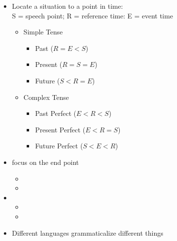 \documentclass[headrule,footrule]{foils}
\begin{document}
\begin{itemize}
\item  Locate a situation to a point in time: 
  \\ S = speech point;  R = reference time:  E = event time
\begin{itemize}
\item  Simple Tense
  \begin{itemize}
  \item Past ($R = E < S$) 
\item  Present ($R = S = E$)  
\item  Future ($S < R = E$) 
\end{itemize}
\item Complex Tense
\begin{itemize}
\item  Past Perfect ($E < R < S$) 
\item  Present Perfect ($E < R =S$) 
\item  Future Perfect ($S< E < R$) 
\end{itemize}
\end{itemize}
\end{itemize}


\begin{itemize}
\item  {} focus on the end point
  \begin{itemize}
  \item  {} 
  \item  {}  %
  \end{itemize}
\item  {} 
  \begin{itemize}
  \item  {} 
  \item  {} 
\end{itemize}
\item Different languages grammaticalize different things
\end{itemize}
\end{document}
